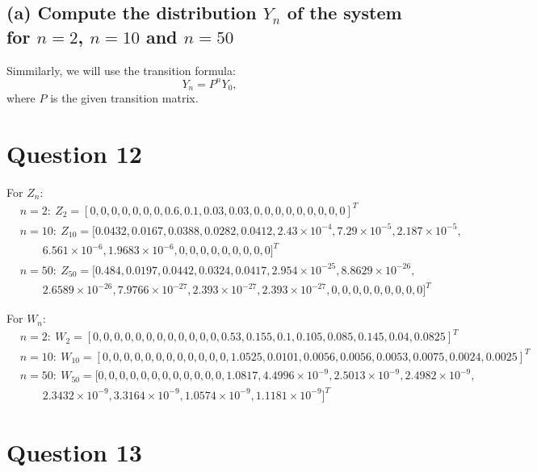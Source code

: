 \documentclass{article}
\begin{document}
    \subsection*{(a) Compute the distribution \( Y_n \) of the system for \( n = 2\), \(n = 10\) and \(n = 50 \)}
    Simmilarly, we will use the transition formula:
    \[
        Y_n = P^n Y_0,
    \]
    where \( P \) is the given transition matrix.
    \section*{Question 12}

    For \( Z_n \):
    \[
        \begin{aligned}
            &n = 2: \ Z_2 = [0, 0, 0, 0, 0, 0, 0, 0.6, 0.1, 0.03, 0.03, 0, 0, 0, 0, 0, 0, 0, 0, 0]^{T} \\
            &n = 10: \ Z_{10} = [0.0432, 0.0167, 0.0388, 0.0282, 0.0412, 2.43 \times 10^{-4}, 7.29 \times 10^{-5}, 2.187 \times 10^{-5}, \\
            &\quad \quad 6.561 \times 10^{-6}, 1.9683 \times 10^{-6}, 0, 0, 0, 0, 0, 0, 0, 0, 0]^{T} \\
            &n = 50: \ Z_{50} = [0.484, 0.0197, 0.0442, 0.0324, 0.0417, 2.954 \times 10^{-25}, 8.8629 \times 10^{-26}, \\
            &\quad \quad 2.6589 \times 10^{-26}, 7.9766 \times 10^{-27}, 2.393 \times 10^{-27}, 2.393 \times 10^{-27}, 0, 0, 0, 0, 0, 0, 0, 0, 0]^{T}
        \end{aligned}
    \]

    For \( W_n \):
    \[
        \begin{aligned}
            &n = 2: \ W_2 = [0, 0, 0, 0, 0, 0, 0, 0, 0, 0, 0, 0, 0.53, 0.155, 0.1, 0.105, 0.085, 0.145, 0.04, 0.0825]^{T} \\
            &n = 10: \ W_{10} = [0, 0, 0, 0, 0, 0, 0, 0, 0, 0, 0, 0, 1.0525, 0.0101, 0.0056, 0.0056, 0.0053, 0.0075, 0.0024, 0.0025]^{T} \\
            &n = 50: \ W_{50} =[0, 0, 0, 0, 0, 0, 0, 0, 0, 0, 0, 0, 1.0817, 4.4996 \times 10^{-9}, 2.5013 \times 10^{-9}, 2.4982 \times 10^{-9}, \\
            &\quad \quad 2.3432 \times 10^{-9}, 3.3164 \times 10^{-9}, 1.0574 \times 10^{-9}, 1.1181 \times 10^{-9}]^{T}
        \end{aligned}
    \]

    \section*{Question 13}
\end{document}
